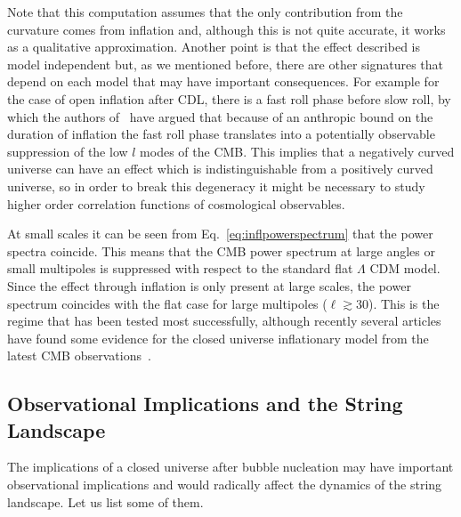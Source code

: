 \documentclass[a4paper,11pt]{article}
\numberwithin{equation}{section}
\begin{document}
\begin{itemize}
Note that this  computation  assumes that the only contribution from the curvature comes from inflation and, although this is  not quite accurate, it works as a qualitative  approximation. Another  point is that the effect  described is model independent but, as we mentioned  before, there are other signatures that depend on each model that may have important consequences. For example for the case of open inflation after CDL,  there is a fast roll phase before slow roll, by which  the authors of~\cite{Freivogel:2005vv,Bousso:2013uia} have argued that because of an  anthropic bound on the duration of inflation the fast roll phase translates into a potentially observable suppression of the low $l$ modes of the CMB. This  implies that a negatively curved universe can have an effect which is  indistinguishable from  a positively curved universe, so in  order to break this degeneracy it might be necessary to study higher order correlation functions of cosmological observables. 

At small scales it can be seen from Eq.~\eqref{eq:inflpowerspectrum} that the power spectra coincide. This means that the CMB  power spectrum at large angles or small multipoles is suppressed with respect to the standard flat $\Lambda$ CDM model. Since the effect  through inflation is only  present at large scales, the power spectrum coincides with the flat case for large multipoles ($\ell \gtrsim 30$). This  is the regime that has been tested most successfully, although recently several articles have found some evidence for the closed universe inflationary model from the latest CMB observations~\cite{DiValentino:2019qzk,Handley:2019tkm,Efstathiou:2020wem}.
\end{itemize}


\subsection*{Observational Implications and the String Landscape}

The implications of a closed universe after bubble nucleation may have important observational implications and would radically affect the dynamics of the string landscape. Let us list some of them.
\end{document}

